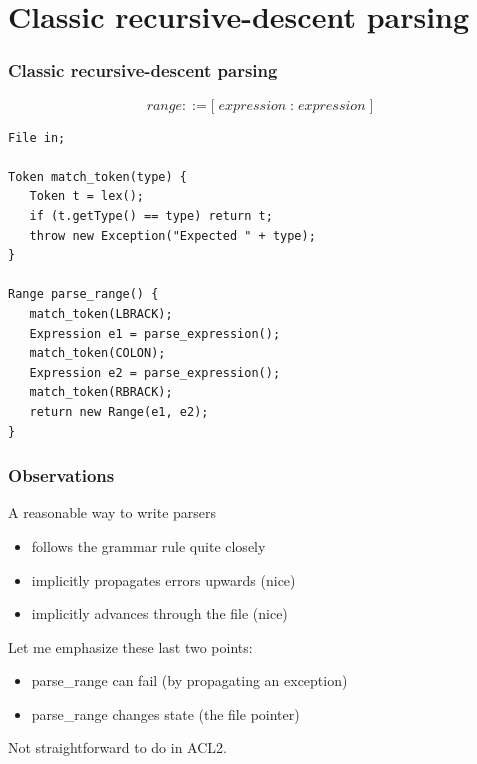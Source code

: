 \documentclass{beamer}
\newcommand{\Highlight}[1]{{\color{Highlight}#1}}
\newcommand{\SmallSkip}{\vspace{0.5cm}\noindent}
\begin{document}
\section[Classic recursive-descent parsing]{Classic recursive-descent parsing}
\begin{frame}[fragile]
\frametitle{Classic recursive-descent parsing}

\[
\mathit{range} ::= \textbf{[} \; \mathit{expression} \; \textbf{:} \; \mathit{expression} \; \textbf{]}
\]
{\small
\begin{verbatim}
File in;

Token match_token(type) {
   Token t = lex();
   if (t.getType() == type) return t;
   throw new Exception("Expected " + type);
}

Range parse_range() {
   match_token(LBRACK);
   Expression e1 = parse_expression();
   match_token(COLON);
   Expression e2 = parse_expression();
   match_token(RBRACK);
   return new Range(e1, e2);
}
\end{verbatim}}
\end{frame}

\begin{frame}

\frametitle{Observations}

A reasonable way to write parsers
\begin{itemize}
\item follows the grammar rule quite closely
\item implicitly propagates errors upwards (nice)
\item implicitly advances through the file (nice)
\end{itemize}

\SmallSkip

Let me emphasize these last two points:
\begin{itemize}
\item parse\_range can fail (by propagating an exception)
\item parse\_range changes state (the file pointer)
\end{itemize}

\SmallSkip

\Highlight{Not straightforward} to do in ACL2.

\end{frame}
\end{document}
